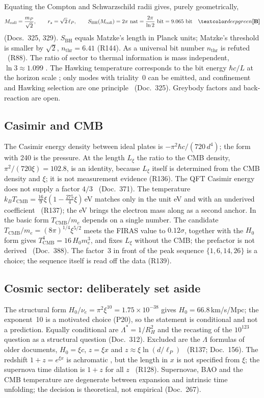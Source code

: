 Equating the Compton and Schwarzschild radii gives, purely geometrically,
\begin{equation}
  M_{\text{coll}}=\frac{m_P}{\sqrt2},\qquad r_s=\sqrt2\,\ell_P,\qquad
  S_{\text{BH}}(M_{\text{coll}})=2\pi\ \text{nat}=\frac{2\pi}{\ln2}\ \text{bit}=9.065\ \text{bit}\quad\BM
\end{equation}
(Docs.~325, 329). $S_{\text{BH}}$ equals Matzke's length in Planck units; Matzke's threshold is
smaller by $\sqrt2$, $n_{\text{thr}}=6.41$ (R144). As a universal bit number $n_{\text{thr}}$ is
refuted \XM\ (R88). The ratio of sector to thermal information is mass independent,
$\ln3\approx1.099$ \BM. The Hawking temperature corresponds to the bit energy $\hbar c/L$ at the
horizon scale \KM; only modes with triality~0 can be emitted, and confinement and Hawking
selection are one principle \BM\ (Doc.~325). Greybody factors and back-reaction are open.

\subsection{Casimir and CMB}

The Casimir energy density between ideal plates is $-\pi^2\hbar c/(720\,d^4)$; the form with 240
is the pressure. At the length $L_\xi$ the ratio to the CMB density, $\pi^2/(720\xi)=102.8$, is
an identity, because $L_\xi$ itself is determined from the CMB density and $\xi$; it is not
measurement evidence (R136). The QFT Casimir energy does not supply a factor $4/3$ \XM\
(Doc.~371). The temperature $k_BT_{\text{CMB}}=\tfrac{16}{9}\xi(1-\tfrac{275}{4}\xi)$\,eV matches
only in the unit eV and with an underived coefficient \SM\ (R137); the eV brings the electron mass along as a second
anchor. In the basic form $T_{\text{CMB}}/m_e$ depends on a single number. The candidate
$T_{\text{CMB}}/m_e=(8\pi)^{1/4}\xi^{5/2}$ meets the FIRAS value to $0.12\sigma$, together with the
$H_0$ form gives $T_{\text{CMB}}^4=16\,H_0m_e^3$, and fixes $L_\xi$ without the CMB; the prefactor is
not derived \SM\ (Doc.~388). The factor~3 in front of the
peak sequence $\{1,6,14,26\}$ is a choice; the sequence itself is read off the data (R139).

\subsection{Cosmic sector: deliberately set aside}

The structural form $H_0/\nu_e=\pi^2\xi^{10}=1.75\times10^{-38}$ gives $H_0=66.8$\,km/s/Mpc; the
exponent~10 is a motivated choice (P20), so the statement is conditional and not a prediction.
Equally conditional are $\Lambda^*=1/R_H^2$ and the recasting of the $10^{123}$ question as a
structural question (Doc.~312). Excluded are the $\Lambda$ formulas of older documents,
$H_0=\xi c$, $z=\xi x$ and $z\approx\xi\ln(d/\ell_P)$ \XM\ (R137; Doc.~156). The redshift
$1+z=e^{\xi x}$ is achromatic \KM, but the length in $x$ is not specified from $\xi$; the
supernova time dilation is $1+z$ for all $z$ \BM\ (R128). Supernovae, BAO and the CMB
temperature are degenerate between expansion and intrinsic time unfolding; the decision is
theoretical, not empirical (Doc.~267).

